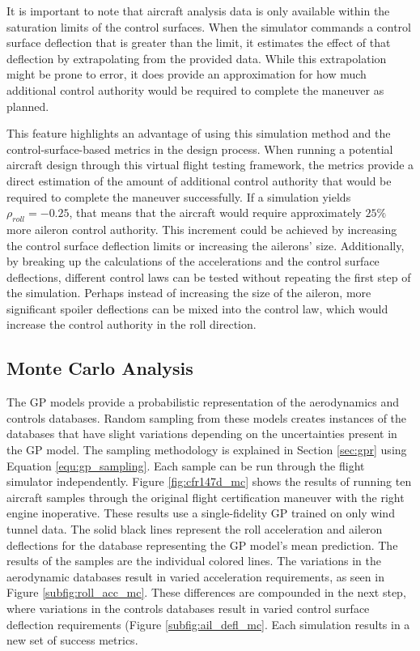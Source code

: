 It is important to note that aircraft analysis data is only available within the saturation limits of the control surfaces. 
When the simulator commands a control surface deflection that is greater than the limit, it estimates the effect of that deflection by extrapolating from the provided data. 
While this extrapolation might be prone to error, it does provide an approximation for how much additional control authority would be required to complete the maneuver as planned. 

This feature highlights an advantage of using this simulation method and the control-surface-based metrics in the design process. 
When running a potential aircraft design through this virtual flight testing framework, the metrics provide a direct estimation of the amount of additional control authority that would be required to complete the maneuver successfully. 
If a simulation yields $\rho_{roll} = -0.25$, that means that the aircraft would require approximately $25\%$ more aileron control authority. 
This increment could be achieved by increasing the control surface deflection limits or increasing the ailerons' size. 
Additionally, by breaking up the calculations of the accelerations and the control surface deflections, different control laws can be tested without repeating the first step of the simulation. 
Perhaps instead of increasing the size of the aileron, more significant spoiler deflections can be mixed into the control law, which would increase the control authority in the roll direction. 

\subsection{Monte Carlo Analysis} \label{subsec:mc_analysis}

The GP models provide a probabilistic representation of the aerodynamics and controls databases. 
Random sampling from these models creates instances of the databases that have slight variations depending on the uncertainties present in the GP model.
The sampling methodology is explained in Section \ref{sec:gpr} using Equation \ref{equ:gp_sampling}.
Each sample can be run through the flight simulator independently.
Figure \ref{fig:cfr147d_mc} shows the results of running ten aircraft samples through the original flight certification maneuver with the right engine inoperative.
These results use a single-fidelity GP trained on only wind tunnel data. 
The solid black lines represent the roll acceleration and aileron deflections for the database representing the GP model's mean prediction. 
The results of the samples are the individual colored lines. 
The variations in the aerodynamic databases result in varied acceleration requirements, as seen in Figure \ref{subfig:roll_acc_mc}.
These differences are compounded in the next step, where variations in the controls databases result in varied control surface deflection requirements (Figure \ref{subfig:ail_defl_mc}.
Each simulation results in a new set of success metrics. 

